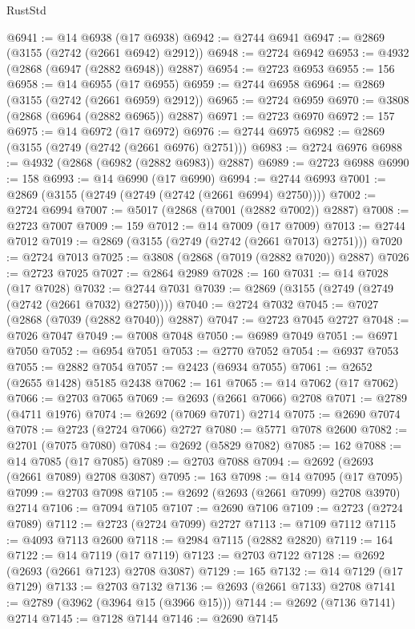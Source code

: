 \begin{lexlean}{RustStd}
\begin{coremodule}
@6941 := @14 @6938 (@17 @6938)
@6942 := @2744 @6941
@6947 := @2869 (@3155 (@2742 (@2661 @6942) @2912))
@6948 := @2724 @6942
@6953 := @4932 (@2868 (@6947 (@2882 @6948)) @2887)
@6954 := @2723 @6953
@6955 := 156
@6958 := @14 @6955 (@17 @6955)
@6959 := @2744 @6958
@6964 := @2869 (@3155 (@2742 (@2661 @6959) @2912))
@6965 := @2724 @6959
@6970 := @3808 (@2868 (@6964 (@2882 @6965)) @2887)
@6971 := @2723 @6970
@6972 := 157
@6975 := @14 @6972 (@17 @6972)
@6976 := @2744 @6975
@6982 := @2869 (@3155 (@2749 (@2742 (@2661 @6976) @2751)))
@6983 := @2724 @6976
@6988 := @4932 (@2868 (@6982 (@2882 @6983)) @2887)
@6989 := @2723 @6988
@6990 := 158
@6993 := @14 @6990 (@17 @6990)
@6994 := @2744 @6993
@7001 := @2869 (@3155 (@2749 (@2749 (@2742 (@2661 @6994) @2750))))
@7002 := @2724 @6994
@7007 := @5017 (@2868 (@7001 (@2882 @7002)) @2887)
@7008 := @2723 @7007
@7009 := 159
@7012 := @14 @7009 (@17 @7009)
@7013 := @2744 @7012
@7019 := @2869 (@3155 (@2749 (@2742 (@2661 @7013) @2751)))
@7020 := @2724 @7013
@7025 := @3808 (@2868 (@7019 (@2882 @7020)) @2887)
@7026 := @2723 @7025
@7027 := @2864 @2989
@7028 := 160
@7031 := @14 @7028 (@17 @7028)
@7032 := @2744 @7031
@7039 := @2869 (@3155 (@2749 (@2749 (@2742 (@2661 @7032) @2750))))
@7040 := @2724 @7032
@7045 := @7027 (@2868 (@7039 (@2882 @7040)) @2887)
@7047 := @2723 @7045 @2727
@7048 := @7026 @7047
@7049 := @7008 @7048
@7050 := @6989 @7049
@7051 := @6971 @7050
@7052 := @6954 @7051
@7053 := @2770 @7052
@7054 := @6937 @7053
@7055 := @2882 @7054
@7057 := @2423 (@6934 @7055)
@7061 := @2652 (@2655 @1428) @5185 @2438
@7062 := 161
@7065 := @14 @7062 (@17 @7062)
@7066 := @2703 @7065
@7069 := @2693 (@2661 @7066) @2708
@7071 := @2789 (@4711 @1976)
@7074 := @2692 (@7069 @7071) @2714
@7075 := @2690 @7074
@7078 := @2723 (@2724 @7066) @2727
@7080 := @5771 @7078 @2600
@7082 := @2701 (@7075 @7080)
@7084 := @2692 (@5829 @7082)
@7085 := 162
@7088 := @14 @7085 (@17 @7085)
@7089 := @2703 @7088
@7094 := @2692 (@2693 (@2661 @7089) @2708 @3087)
@7095 := 163
@7098 := @14 @7095 (@17 @7095)
@7099 := @2703 @7098
@7105 := @2692 (@2693 (@2661 @7099) @2708 @3970) @2714
@7106 := @7094 @7105
@7107 := @2690 @7106
@7109 := @2723 (@2724 @7089)
@7112 := @2723 (@2724 @7099) @2727
@7113 := @7109 @7112
@7115 := @4093 @7113 @2600
@7118 := @2984 @7115 (@2882 @2820)
@7119 := 164
@7122 := @14 @7119 (@17 @7119)
@7123 := @2703 @7122
@7128 := @2692 (@2693 (@2661 @7123) @2708 @3087)
@7129 := 165
@7132 := @14 @7129 (@17 @7129)
@7133 := @2703 @7132
@7136 := @2693 (@2661 @7133) @2708
@7141 := @2789 (@3962 (@3964 @15 (@3966 @15)))
@7144 := @2692 (@7136 @7141) @2714
@7145 := @7128 @7144
@7146 := @2690 @7145

\end{coremodule}
\end{lexlean}
